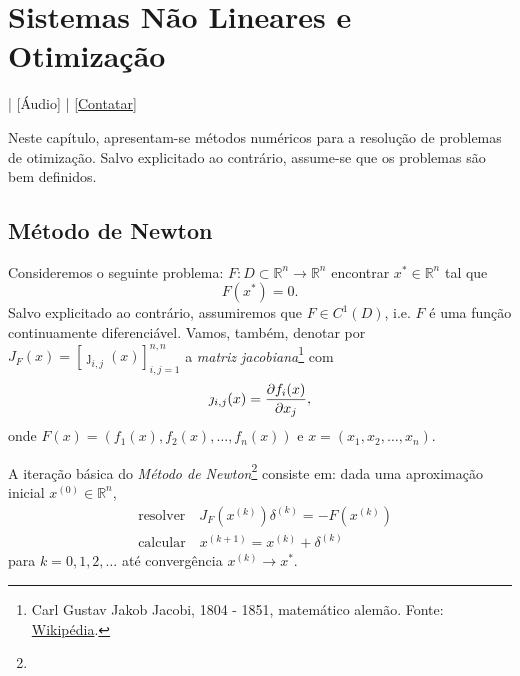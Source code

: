 
\chapter{Sistemas Não Lineares e Otimização}\label{cap_otimizacao}
\thispagestyle{fancy}

\begin{flushright}
  [Vídeo] | [Áudio] | \href{https://phkonzen.github.io/notas/contato.html}{[Contatar]}
\end{flushright}

Neste capítulo, apresentam-se métodos numéricos para a resolução de problemas de otimização. Salvo explicitado ao contrário, assume-se que os problemas são bem definidos.

\section{Método de Newton}\label{cap_otimizacao_sec_newton}

Consideremos o seguinte problema: $F:D\subset \mathbb{R}^n\to\mathbb{R}^n$ encontrar $x^*\in\mathbb{R}^n$ tal que
\begin{equation}
  F(x^*) = 0.
\end{equation}
Salvo explicitado ao contrário, assumiremos que $F\in C^1(D)$, i.e. $F$ é uma função continuamente diferenciável. Vamos, também, denotar por $J_F(x) = [\jmath_{i,j}(x)]_{i,j=1}^{n,n}$ a \emph{matriz jacobiana}\footnote{Carl Gustav Jakob Jacobi, 1804 - 1851, matemático alemão. Fonte: \href{https://pt.wikipedia.org/wiki/Carl_Gustav_Jakob_Jacobi}{Wikipédia}.} com
\begin{equation}
  \jmath_{i,j}(x) = \frac{\partial f_i(x)}{\partial x_j},
\end{equation}
onde $F(x) = (f_1(x), f_2(x), \dotsc, f_n(x))$ e $x = (x_1, x_2,\dotsc, x_n)$.

A iteração básica do \emph{Método de Newton}\footnote{{\newton}} consiste em: dada uma aproximação inicial $x^{(0)}\in\mathbb{R}^n$,
\begin{align}
  &\text{resolver}\quad J_F\left(x^{(k)}\right)\delta^{(k)} = -F\left(x^{(k)}\right)\\
  &\text{calcular}\quad x^{(k+1)} = x^{(k)} + \delta^{(k)}
\end{align}
para $k=0,1,2,\ldots$ até convergência $x^{(k)}\to x^*$.

